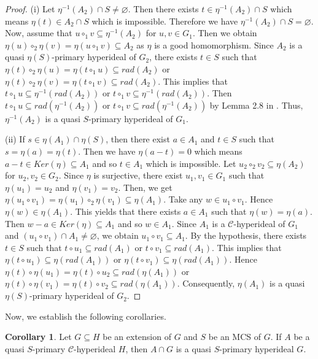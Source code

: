 \documentclass[preprint,review,10pt]{amsart}
\theoremstyle{definition}
\newtheorem{corollary}[theorem]{Corollary}
\theoremstyle{remark}
\numberwithin{equation}{section}
\begin{document}
\begin{proof}
(i) Let $\eta^{-1} (A_2) \cap S \neq \varnothing$. Then there exists $t \in \eta^{-1} (A_2) \cap S$ which means $\eta(t) \in A_2 \cap S$ which is impossible. Therefore we have $\eta^{-1} (A_2) \cap S= \varnothing$. Now, assume that $u \circ_1 v \subseteq \eta^{-1}(A_2)$ for $u,v \in G_1$. Then we obtain $\eta(u) \circ_2 \eta(v)=\eta(u \circ _1 v) \subseteq A_2$   as $\eta$ is a good homomorphism. Since $A_2$ is a  quasi $\eta(S)$-primary  hyperideal of $G_2$, there exists $t \in S$ such that $\eta(t) \circ_2 \eta(u)=\eta(t \circ_1 u ) \subseteq rad(A_2)$  or $\eta(t) \circ_2 \eta(v)=\eta(t \circ_1 v ) \subseteq rad(A_2)$. This implies that $t \circ_1 u \subseteq \eta^{-1}(rad(A_2))  $ or $t \circ_1 v \subseteq \eta^{-1}(rad(A_2))  $. Then $t \circ_1 u   \subseteq rad(\eta^{-1}(A_2))$ or $t \circ_1 v   \subseteq rad(\eta^{-1}(A_2))$ by Lemma 2.8 in \cite{Akray}. Thus, $\eta^{-1}(A_2)$ is a quasi $S$-primary  hyperideal  of $G_1$.

(ii) If $s \in \eta(A_1) \cap \eta(S)$, then there exist $a \in A_1$ and $t \in S$ such that $s=\eta(a)=\eta(t)$. Then we have $\eta(a-t)=0$ which means $a-t \in Ker (\eta) \subseteq A_1$ and so $t \in A_1$ which is impossible. Let $u_2 \circ_2 v_2 \subseteq \eta(A_2)$ for $u_2, v_2 \in G_2$. Since $\eta$ is surjective, there exist $u_1, v_1 \in G_1$ such that $\eta(u_1)=u_2$ and $\eta(v_1)=v_2$. Then, we get $\eta(u_1 \circ v_1)=\eta(u_1) \circ_2 \eta(v_1) \subseteq \eta(A_1)$. Take any $w \in u_1 \circ v_1$. Hence $\eta(w) \in \eta(A_1)$. This yields that there exists $a \in A_1$ such that $\eta(w)=\eta(a)$. Then  $w - a \in Ker (\eta) \subseteq A_1$ and so $w \in A_1$. Since $A_1$ is a $\mathcal{C}$-hyperideal of $G_1$ and $(u_1 \circ v_1) \cap A_1 \neq \varnothing$, we obtain $u_1 \circ v_1 \subseteq A_1$. By the hypothesis,  there exists $t \in S$ such that $t \circ u_1 \subseteq rad(A_1)$ or $t \circ v_1 \subseteq rad(A_1)$. This implies that $\eta(t \circ u_1) \subseteq \eta(rad(A_1))$ or $\eta(t \circ v_1) \subseteq \eta(rad(A_1))$. Hence $ \eta(t) \circ \eta(u_1)= \eta(t) \circ u_2 \subseteq rad(\eta(A_1))$ or $ \eta(t) \circ \eta(v_1)= \eta(t) \circ v_2 \subseteq rad(\eta(A_1))$. Consequently, $\eta(A_1)$ is a quasi $\eta(S)$-primary  hyperideal of $G_2$.
\end{proof}
Now, we establish the following corollaries.
\begin{corollary}
Let $G \subseteq H$ be an extension of $G$ and $S$ be an MCS of $G$. If $A$ be a quasi $S$-primary  $\mathcal{C}$-hyperideal $H$, then $A \cap G$ is a quasi $S$-primary  hyperideal $G$.
\end{corollary}
\end{document}
